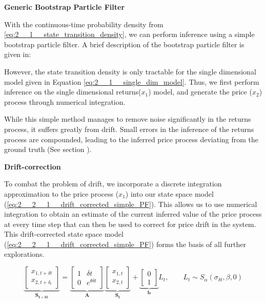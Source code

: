 \documentclass[../main.tex]{subfiles}
\begin{document}

\textbf{Generic Bootstrap Particle Filter}

With the continuous-time probability density from \autoref{eq:2__1__state_transition_density}, we can perform inference using a simple bootstrap particle filter. A brief description of the bootstrap particle filter is given in: 

However, the state transition density is only tractable for the single dimensional model given in Equation \autoref{eq:2__1__single_dim_model}. Thus, we first perform inference on the single dimensional returns($x_1$) model, and generate the price ($x_2$) process through numerical integration. 

While this simple method manages to remove noise significantly in the returns process, it suffers greatly from drift. Small errors in the inference of the returns process are compounded, leading to the inferred price process deviating from the ground truth (See section ).

\textbf{Drift-correction}

To combat the problem of drift, we incorporate a discrete integration approximation to the price process ($x_1$) into our state space model (\autoref{eq:2__2__1__drift_corrected_simple_PF}). This allows us to use numerical integration to obtain an estimate of the current inferred value of the price process at every time step that can then be used to correct for price drift in the system. This drift-corrected state space model (\autoref{eq:2__2__1__drift_corrected_simple_PF}) forms the basis of all further explorations.

\begin{equation}
    \underbrace{
        \begin{bmatrix}
        x_{1,t+\delta t} \\ x_{2,t + \delta_t}
        \end{bmatrix}
    }_{\mathbf{S_{t + \delta t}}}
     =
    \underbrace{
        \begin{bmatrix}
        1 & \delta t \\ 0 & e^{\theta \delta t}
        \end{bmatrix}
    }_{\mathbf{A}}
    \underbrace{
        \begin{bmatrix}
        x_{1,t} \\ x_{2,t}
        \end{bmatrix}
    }_{\mathbf{S_t}}
    + 
    \underbrace{
        \begin{bmatrix}
        0 \\ 1
        \end{bmatrix}
    }_{\mathbf{b}} L_t, \qquad  L_t \sim S_\alpha (\sigma_{\delta t}, \beta, 0)
    \label{eq:2__2__1__drift_corrected_simple_PF}
\end{equation}
\end{document}
